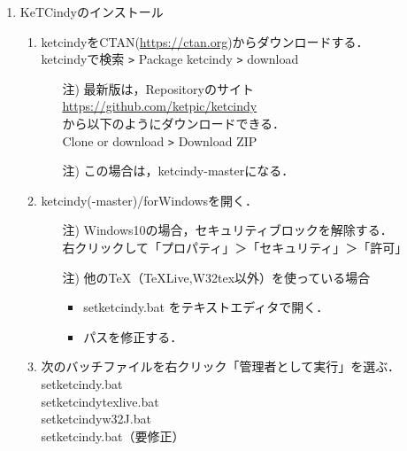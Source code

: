 \documentclass{ujarticle}
\begin{document}
\begin{enumerate}[\bf\large 1.]
\item KeTCindyのインストール
  \begin{enumerate}[(1)]
  \item ketcindyをCTAN(\url{https://ctan.org})からダウンロードする．\\
  \hspace*{10mm}ketcindyで検索 \verb|>| Package ketcindy \verb|>| download
    \begin{itemize}
    \item[注)]最新版は，Repositoryのサイト\\
        \hspace*{10mm}\url{https://github.com/ket­pic/ketcindy}\\
       から以下のようにダウンロードできる．\\
        \hspace*{10mm}Clone or download \verb|>| Download ZIP
    \item[注)]この場合は，ketcindy-masterになる．
    \end{itemize}
  \item ketcindy(-master)/forWindowsを開く．
    \begin{itemize}
    \item[注)]Windows10の場合，セキュリティブロックを解除する．\\
\hspace*{5mm}右クリックして「プロパティ」＞「セキュリティ」＞「許可」
    \item[注)]他のTeX（TeXLive,W32tex以外）を使っている場合
      \begin{itemize}
      \item setketcindy.bat をテキストエディタで開く．
      \item パスを修正する．
      \end{itemize}
    \end{itemize}
  \item 次のバッチファイルを右クリック「管理者として実行」を選ぶ．\\
  \hspace*{3zw} setketcindy.bat\\
  \hspace*{3zw} setketcindytexlive.bat\\
  \hspace*{3zw} setketcindyw32J.bat\\
  \hspace*{3zw} setketcindy.bat（要修正）
   \begin{itemize}

\end{itemize}
\end{enumerate}
\end{enumerate}
\end{document}
